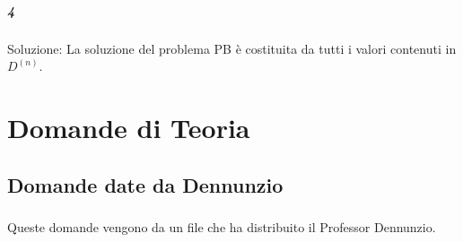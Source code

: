 \documentclass[12pt, a4paper, openany]{book}
\begin{document}
\paragraph*{4}Soluzione:
La soluzione del problema PB è costituita da tutti i valori contenuti in $D^{(n)}$.



\chapter{Domande di Teoria}

	\section{Domande date da Dennunzio}
	\paragraph*{}Queste domande vengono da un file che ha distribuito il Professor Dennunzio.
\end{document}
